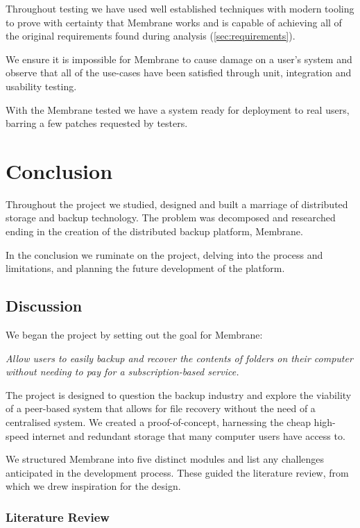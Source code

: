 \documentclass[11pt, a4paper, twoside]{report}
\begin{document}
Throughout testing we have used well established techniques with modern tooling to prove with certainty that Membrane works and is capable of achieving all of the original requirements found during analysis (\ref{sec:requirements}).

We ensure it is impossible for Membrane to cause damage on a user's system and observe that all of the use-cases have been satisfied through unit, integration and usability testing.

With the Membrane tested we have a system ready for deployment to real users, barring a few patches requested by testers.

\chapter{Conclusion}

Throughout the project we studied, designed and built a marriage of distributed storage and backup technology. The problem was decomposed and researched ending in the creation of the distributed backup platform, Membrane.

In the conclusion we ruminate on the project, delving into the process and limitations, and planning the future development of the platform.

\section{Discussion}

We began the project by setting out the goal for Membrane:

\begin{displayquote}
 \emph{Allow users to easily backup and recover the contents of folders on their computer without needing to pay for a subscription-based service.}
\end{displayquote}

The project is designed to question the backup industry and explore the viability of a peer-based system that allows for file recovery without the need of a centralised system. We created a proof-of-concept, harnessing the cheap high-speed internet and redundant storage that many computer users have access to.

We structured Membrane into five distinct modules and list any challenges anticipated in the development process. These guided the literature review, from which we drew inspiration for the design.

\subsection{Literature Review}
\end{document}
